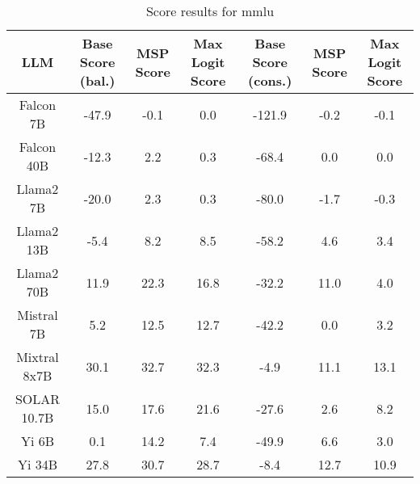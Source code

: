 \renewcommand\arraystretch{1.2}
\begin{table*}
\centering
\begin{tabular}{c|c|c|c|c|c|c}
LLM & Base Score (bal.) & MSP Score & Max Logit Score & Base Score (cons.) & MSP Score & Max Logit Score\\ \hline
Falcon 7B & -47.9 & -0.1 & 0.0 & -121.9 & -0.2 & -0.1\\
Falcon 40B & -12.3 & 2.2 & 0.3 & -68.4 & 0.0 & 0.0\\
Llama2 7B & -20.0 & 2.3 & 0.3 & -80.0 & -1.7 & -0.3\\
Llama2 13B & -5.4 & 8.2 & 8.5 & -58.2 & 4.6 & 3.4\\
Llama2 70B & 11.9 & 22.3 & 16.8 & -32.2 & 11.0 & 4.0\\
Mistral 7B & 5.2 & 12.5 & 12.7 & -42.2 & 0.0 & 3.2\\
Mixtral 8x7B & 30.1 & 32.7 & 32.3 & -4.9 & 11.1 & 13.1\\
SOLAR 10.7B & 15.0 & 17.6 & 21.6 & -27.6 & 2.6 & 8.2\\
Yi 6B & 0.1 & 14.2 & 7.4 & -49.9 & 6.6 & 3.0\\
Yi 34B & 27.8 & 30.7 & 28.7 & -8.4 & 12.7 & 10.9\\
\hline
\end{tabular}
\caption{Score results for mmlu}
\end{table*}
\label{tab:mmlu_score}
